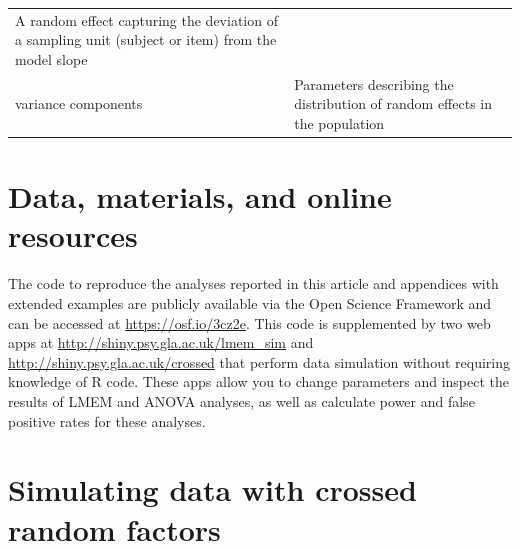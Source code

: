 \documentclass[
  english,
  doc,floatsintext]{apa6}
\begin{document}
\begin{tcolorbox}[colback=black!5!white,colframe=white!5!black,title=Box 1. Glossary of terms]
\begin{longtable}[]{@{}ll@{}}
\begin{minipage}[t]{0.65\columnwidth}
A random effect capturing the deviation of a sampling unit (subject or item) from the model slope\strut
\end{minipage}\tabularnewline
\begin{minipage}[t]{0.29\columnwidth}\raggedright
variance components\strut
\end{minipage} & \begin{minipage}[t]{0.65\columnwidth}\raggedright
Parameters describing the distribution of random effects in the
population\strut
\end{minipage}\tabularnewline
\end{longtable}
\end{tcolorbox}

\hypertarget{data-materials-and-online-resources}{%
\section{Data, materials, and online resources}\label{data-materials-and-online-resources}}

The code to reproduce the analyses reported in this article and appendices with extended examples are publicly available via the Open Science Framework and can be accessed at \url{https://osf.io/3cz2e}. This code is supplemented by two web apps at \url{http://shiny.psy.gla.ac.uk/lmem_sim} and \url{http://shiny.psy.gla.ac.uk/crossed} that perform data simulation without requiring knowledge of R code. These apps allow you to change parameters and inspect the results of LMEM and ANOVA analyses, as well as calculate power and false positive rates for these analyses.

\hypertarget{simulating-data-with-crossed-random-factors}{%
\section{Simulating data with crossed random factors}\label{simulating-data-with-crossed-random-factors}}
\end{document}
